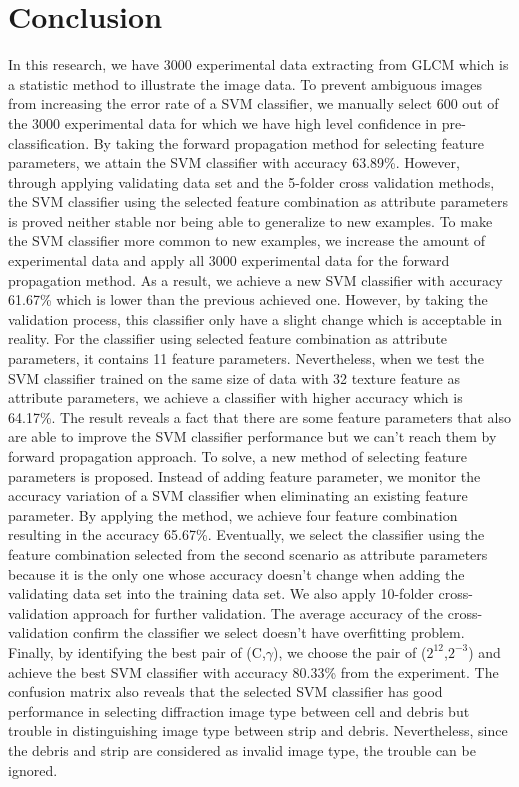 \section{Conclusion}
In this research, we have 3000 experimental data extracting from GLCM which is a statistic method to illustrate the image data. To prevent ambiguous images from increasing the error rate of a SVM classifier, we manually select 600 out of the 3000 experimental data for which we have high level confidence in pre-classification. By taking the forward propagation method for selecting feature parameters, we attain the SVM classifier with accuracy 63.89\%. However, through applying validating data set and the 5-folder cross validation methods, the SVM classifier using the selected feature combination as attribute parameters is proved neither stable nor being able to generalize to new examples. To make the SVM classifier more common to new examples, we increase the amount of experimental data and apply all 3000 experimental data for the forward propagation method. As a result, we achieve a new SVM classifier with accuracy 61.67\% which is lower than the previous achieved one. However, by taking the validation process, this classifier only have a slight change which is acceptable in reality. For the classifier using selected feature combination as attribute parameters, it contains 11 feature parameters. Nevertheless, when we test the SVM classifier trained on the same size of data with 32 texture feature as attribute parameters, we achieve a classifier with higher accuracy which is 64.17\%. The result reveals a fact that there are some feature parameters that also are able to improve the SVM classifier performance but we can't reach them by forward propagation approach. To solve, a new method of selecting feature parameters is proposed. Instead of adding feature parameter, we monitor the accuracy variation of a SVM classifier when eliminating an existing feature parameter. By applying the method, we achieve four feature combination resulting in the accuracy 65.67\%. Eventually, we select the classifier using the feature combination selected from the second scenario as attribute parameters because it is the only one whose accuracy doesn't change when adding the validating data set into the training data set. We also apply 10-folder cross-validation approach for further validation. The average accuracy of the cross-validation confirm the classifier we select doesn't have overfitting problem. Finally, by identifying the best pair of (C,$\gamma$), we choose the pair of ($2^{12}$,$2^{-3}$) and achieve the best SVM classifier with accuracy 80.33\% from the experiment. The confusion matrix also reveals that the selected SVM classifier has good performance in selecting diffraction image type between cell and debris but trouble in distinguishing image type between strip and debris. Nevertheless, since the debris and strip are considered as invalid image type, the trouble can be ignored.      